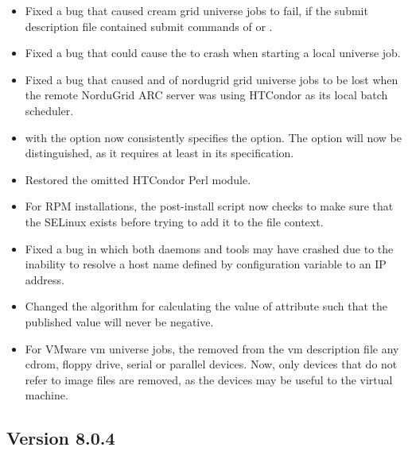 \begin{itemize}
\item Fixed a bug that caused cream grid universe jobs to fail, 
if the submit description file contained 
submit commands of  or .

\item Fixed a bug that could cause the  to crash when
starting a local universe job.

\item Fixed a bug that caused  and  of
nordugrid grid universe jobs to be lost when the remote 
NorduGrid ARC server was using HTCondor as its local batch scheduler.

\item {} with the  option now consistently 
specifies the  option. 
The  option will now be distinguished, as it requires
at least  in its specification.

\item Restored the omitted HTCondor Perl module.

\item For RPM installations, the post-install script now
checks to make sure that the
SELinux  exists before trying to
add it to the  file context.

\item Fixed a bug in which both daemons and tools may have crashed due to
the inability to resolve a host name defined by 
configuration variable  to an IP address.

\item Changed the algorithm for calculating the value of attribute
 such
that the published value will never be negative.

\item For VMware vm universe jobs,
the  removed from the vm description file any cdrom, 
floppy drive, serial or parallel devices.
Now, only devices that do not refer to image files are removed,
as the devices may be useful to the virtual machine.

\end{itemize}


\subsection*{\label{sec:New-8-0-4}Version 8.0.4}

